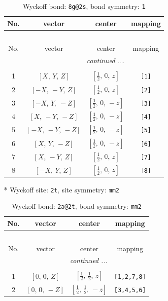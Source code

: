 \documentclass[fleqn,8pt]{jsarticle}
\begin{document}
\begin{longtable}{cccc}
\caption{Wyckoff bond: {\tt 8g@2s}, bond symmetry: {\tt 1}}
 \\
 \hline \hline
No. & vector & center & mapping \\ \hline \endfirsthead

\multicolumn{3}{l}{\tablename\ \thetable{}} \\
 \hline \hline
No. & vector & center & mapping \\ \hline \endhead

 \hline \hline
\multicolumn{3}{r}{\footnotesize\it continued ...} \\ \endfoot

 \hline \hline
\multicolumn{3}{r}{} \\ \endlastfoot

1 & $\left[ X,\, Y,\, Z \right]$ & $\left[ \frac{1}{2},\, 0,\, z \right]$ & {\tt [1]} \\ \hline
2 & $\left[ - X,\, - Y,\, Z \right]$ & $\left[ \frac{1}{2},\, 0,\, z \right]$ & {\tt [2]} \\ \hline
3 & $\left[ - X,\, Y,\, - Z \right]$ & $\left[ \frac{1}{2},\, 0,\, - z \right]$ & {\tt [3]} \\ \hline
4 & $\left[ X,\, - Y,\, - Z \right]$ & $\left[ \frac{1}{2},\, 0,\, - z \right]$ & {\tt [4]} \\ \hline
5 & $\left[ - X,\, - Y,\, - Z \right]$ & $\left[ \frac{1}{2},\, 0,\, - z \right]$ & {\tt [5]} \\ \hline
6 & $\left[ X,\, Y,\, - Z \right]$ & $\left[ \frac{1}{2},\, 0,\, - z \right]$ & {\tt [6]} \\ \hline
7 & $\left[ X,\, - Y,\, Z \right]$ & $\left[ \frac{1}{2},\, 0,\, z \right]$ & {\tt [7]} \\ \hline
8 & $\left[ - X,\, Y,\, Z \right]$ & $\left[ \frac{1}{2},\, 0,\, z \right]$ & {\tt [8]} \\
\end{longtable}
* Wyckoff site: {\tt 2t}, site symmetry: {\tt mm2}
\renewcommand{\arraystretch}{1.2}
\begin{longtable}{cccc}
\caption{Wyckoff bond: {\tt 2a@2t}, bond symmetry: {\tt mm2}}
 \\
 \hline \hline
No. & vector & center & mapping \\ \hline \endfirsthead

\multicolumn{3}{l}{\tablename\ \thetable{}} \\
 \hline \hline
No. & vector & center & mapping \\ \hline \endhead

 \hline \hline
\multicolumn{3}{r}{\footnotesize\it continued ...} \\ \endfoot

 \hline \hline
\multicolumn{3}{r}{} \\ \endlastfoot

1 & $\left[ 0,\, 0,\, Z \right]$ & $\left[ \frac{1}{2},\, \frac{1}{2},\, z \right]$ & {\tt [1,2,7,8]} \\ \hline
2 & $\left[ 0,\, 0,\, - Z \right]$ & $\left[ \frac{1}{2},\, \frac{1}{2},\, - z \right]$ & {\tt [3,4,5,6]} \\
\end{longtable}
\end{document}
